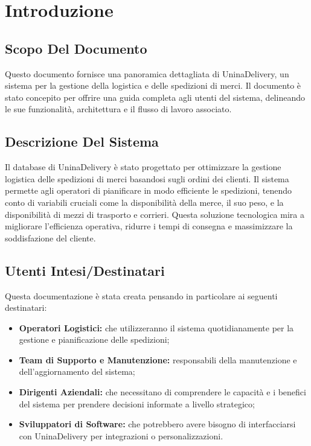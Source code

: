 \section{Introduzione}

\subsection{Scopo Del Documento}

Questo documento fornisce una panoramica dettagliata di UninaDelivery, un sistema per la gestione della logistica e delle spedizioni di merci. Il documento è stato concepito per offrire una guida completa agli utenti del sistema, delineando le sue funzionalità, architettura e il flusso di lavoro associato.

\subsection{Descrizione Del Sistema}

\normalsize{Il database di UninaDelivery è stato progettato per ottimizzare la gestione logistica delle spedizioni di merci basandosi sugli ordini dei clienti. Il sistema permette agli operatori di pianificare in modo efficiente le spedizioni, tenendo conto di variabili cruciali come la disponibilità della merce, il suo peso, e la disponibilità di mezzi di trasporto e corrieri. Questa soluzione tecnologica mira a migliorare l'efficienza operativa, ridurre i tempi di consegna e massimizzare la soddisfazione del cliente.}

\subsection{Utenti Intesi/Destinatari}

Questa documentazione è stata creata pensando in particolare ai seguenti destinatari:

\begin{itemize}[leftmargin=*,label={\textbullet},itemsep=-1pt,topsep=3pt,partopsep=0pt]
    \item \normalsize{\textbf{Operatori Logistici:}} che utilizzeranno il sistema quotidianamente per la gestione e pianificazione delle spedizioni;
    \item \textbf{Team di Supporto e Manutenzione:} responsabili della manutenzione e dell'aggiornamento del sistema;
    \item \textbf{Dirigenti Aziendali:} che necessitano di comprendere le capacità e i benefici del sistema per prendere decisioni informate a livello strategico;
    \item \textbf{Sviluppatori di Software:}  che potrebbero avere bisogno di interfacciarsi con UninaDelivery per integrazioni o personalizzazioni.
\end{itemize}